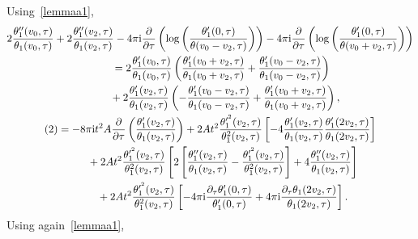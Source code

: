 \documentclass[pdftex]{sigma}%
\numberwithin{equation}{section}
\begin{document}
Using~\eqref{lemmaa1},
\begin{gather*}
2\frac{\theta_1^{\prime\prime}(v_0,\tau)}{\theta_1(v_0,\tau)} +2\frac{\theta_1^{\prime\prime}(v_2,\tau)}{\theta_1(v_2,\tau)}-4\pi {\rm i} \frac{\partial}{\partial \tau}\left( \log\left(\frac{\theta_1^{\prime}(0,\tau)}{\theta(v_0-v_2,\tau)}\right)\right)-4\pi {\rm i} \frac{\partial}{\partial \tau}\left( \log\left(\frac{\theta_1^{\prime}(0,\tau)} {\theta(v_0+v_2,\tau)}\right)\right)
\\ \qquad
{}=2\frac{\theta_1^{\prime}(v_0,\tau)}{\theta_1(v_0,\tau)} \left(\frac{\theta_1^{\prime}(v_0+v_2,\tau)}{\theta_1(v_0+v_2,\tau)}
+\frac{\theta_1^{\prime}(v_0-v_2,\tau)}{\theta_1(v_0-v_2,\tau)}\right)
\\ \qquad\phantom{=} +2\frac{\theta_1^{\prime}(v_2,\tau)}{\theta_1(v_2,\tau)} \left( - \frac{\theta_1^{\prime}(v_0-v_2,\tau)}{\theta_1(v_0-v_2,\tau)} +\frac{\theta_1^{\prime}(v_0+v_2,\tau)}{\theta_1(v_0+v_2,\tau)}\right),
\\
(2)=-8\pi {\rm i}t^2A\frac{\partial}{\partial \tau}\left(\frac{\theta_1^{\prime}(v_2,\tau)}{\theta_1(v_2,\tau)}\right) +2At^2\frac{\theta_1^{\prime^2}(v_2,\tau)}{\theta_1^2(v_2,\tau)} \left[ - 4\frac{\theta_1^{\prime}(v_2,\tau)}{\theta_1(v_2,\tau)} \frac{\theta_1^{\prime}(2v_2,\tau)}{\theta_1(2v_2,\tau)}\right]
\\ \phantom{(2)=}
+2At^2\frac{\theta_1^{\prime^2}(v_2,\tau)}{\theta_1^2(v_2,\tau)} \left[2\left[\frac{\theta_1^{\prime\prime}(v_2,\tau)}{\theta_1(v_2,\tau)} -\frac{\theta_1^{\prime^2}(v_2,\tau)}{\theta_1^2(v_2,\tau)}\right]+4 \frac{\theta_1^{\prime\prime}(v_2,\tau)}{\theta_1(v_2,\tau)} \right]
\\ \hphantom{(2)=}
+2At^2\frac{\theta_1^{\prime^2}(v_2,\tau)}{\theta_1^2(v_2,\tau)}\left[-4\pi {\rm i}\frac{\partial_{\tau}\theta_1^{\prime}(0,\tau)}{\theta_1^{\prime}(0,\tau)}+4\pi {\rm i}\frac{\partial_{\tau}\theta_1(2v_2,\tau)}{\theta_1(2v_2,\tau)} \right].
\end{gather*}
Using again~\eqref{lemmaa1},
\end{document}
